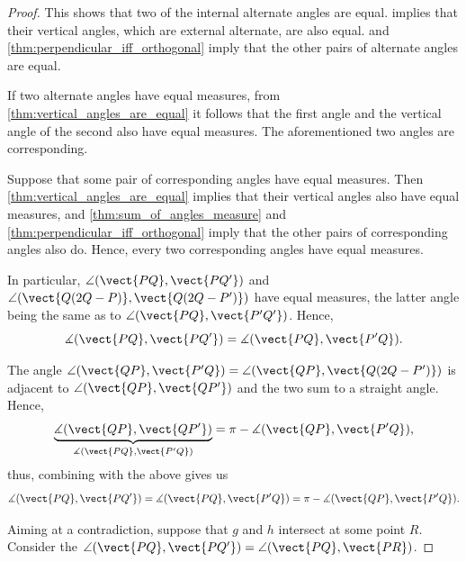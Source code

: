 \begin{proof}
  This shows that two of the internal alternate angles are equal.  implies that their vertical angles, which are external alternate, are also equal.  and \cref{thm:perpendicular_iff_orthogonal} imply that the other pairs of alternate angles are equal.

   If two alternate angles have equal measures, from \cref{thm:vertical_angles_are_equal} it follows that the first angle and the vertical angle of the second also have equal measures. The aforementioned two angles are corresponding.

   Suppose that some pair of corresponding angles have equal measures. Then \cref{thm:vertical_angles_are_equal} implies that their vertical angles also have equal measures, and \cref{thm:sum_of_angles_measure} and \cref{thm:perpendicular_iff_orthogonal} imply that the other pairs of corresponding angles also do. Hence, every two corresponding angles have equal measures.

  In particular, \( \angle(\vect{PQ}, \vect{PQ'}) \) and \( \angle(\vect{Q(2Q - P)}, \vect{Q(2Q - P')}) \) have equal measures, the latter angle being the same as to \( \angle(\vect{PQ}, \vect{P'Q'}) \). Hence,
  \begin{equation*}
    \measuredangle(\vect{PQ}, \vect{PQ'}) = \measuredangle(\vect{PQ}, \vect{P'Q}).
  \end{equation*}

  The angle \( \angle(\vect{QP}, \vect{P'Q}) = \angle(\vect{QP}, \vect{Q(2Q - P')}) \) is adjacent to \( \angle(\vect{QP}, \vect{QP'}) \) and the two sum to a straight angle. Hence,
  \begin{equation*}
    \underbrace{\measuredangle(\vect{QP}, \vect{QP'})}_{\measuredangle(\vect{PQ}, \vect{P'Q})} = \pi - \measuredangle(\vect{QP}, \vect{P'Q}),
  \end{equation*}
  thus, combining with the above gives us
  \begin{equation*}
    \measuredangle(\vect{PQ}, \vect{PQ'}) = \measuredangle(\vect{PQ}, \vect{P'Q}) = \pi - \measuredangle(\vect{QP}, \vect{P'Q}).
  \end{equation*}

  Aiming at a contradiction, suppose that \( g \) and \( h \) intersect at some point \( R \). Consider the \( \angle(\vect{PQ}, \vect{PQ'}) = \angle(\vect{PQ}, \vect{PR}) \).


\end{proof}
